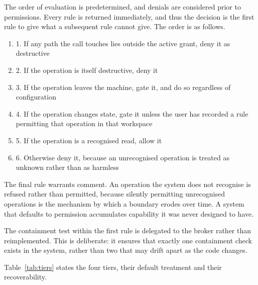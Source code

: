 \documentclass{FastFyp}
\begin{document}
The order of evaluation is predetermined, and denials are considered prior to permissions. Every rule is returned immediately, and thus the decision is the first rule to give what a subsequent rule cannot give. The order is as follows.

\begin{enumerate}
    \item 1. If any path the call touches lies outside the active grant, deny it as destructive
    \item 2. If the operation is itself destructive, deny it
    \item 3. If the operation leaves the machine, gate it, and do so regardless of configuration
    \item 4. If the operation changes state, gate it unless the user has recorded a rule permitting that operation in that workspace
    \item 5. If the operation is a recognised read, allow it
    \item 6. Otherwise deny it, because an unrecognised operation is treated as unknown rather than as harmless
\end{enumerate}

The final rule warrants comment. An operation the system does not recognise is refused rather than permitted, because silently permitting unrecognised operations is the mechanism by which a boundary erodes over time. A system that defaults to permission accumulates capability it was never designed to have.

The containment test within the first rule is delegated to the broker rather than reimplemented. This is deliberate: it ensures that exactly one containment check exists in the system, rather than two that may drift apart as the code changes.

Table~\ref{tab:tiers} states the four tiers, their default treatment and their recoverability.
\end{document}
